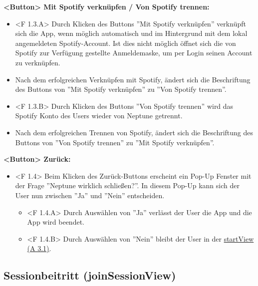 \documentclass[oneside, ngerman]{sdqtechreport}
\begin{document}
\textbf{<Button> Mit Spotify verknüpfen / Von Spotify trennen:}
\begin{itemize}
    \hypertarget{<F 1.3.A>}{}
    \item <F 1.3.A> Durch Klicken des Buttons ''Mit Spotify verknüpfen'' verknüpft sich die App, wenn möglich automatisch und im Hintergrund mit dem lokal angemeldeten Spotify-Account. Ist dies nicht möglich öffnet sich die von Spotify zur Verfügung gestellte Anmeldemaske, um per Login seinen Account zu verknüpfen.
    \item Nach dem erfolgreichen Verknüpfen mit Spotify, ändert sich die Beschriftung des Buttons von ''Mit Spotify verknüpfen'' zu ''Von Spotify trennen''.
    \hypertarget{<F 1.3.B>}{}
    \item <F 1.3.B> Durch Klicken des Buttons ''Von Spotify trennen'' wird das Spotify Konto des Users wieder von Neptune getrennt.
    \item Nach dem erfolgreichen Trennen von Spotify, ändert sich die Beschriftung des Buttons von ''Von Spotify trennen'' zu ''Mit Spotify verknüpfen''.
\end{itemize}

\textbf{<Button> Zurück:}
\begin{itemize}
\hypertarget{<F 1.4>}{}
    \item <F 1.4> Beim Klicken des Zurück-Buttons erscheint ein Pop-Up Fenster mit der Frage ''Neptune wirklich schließen?''. In diesem Pop-Up kann sich der User nun zwischen ''Ja'' und ''Nein'' entscheiden.
    \begin{itemize}
        \hypertarget{<F 1.4.A>}{}
        \item <F 1.4.A> Durch Auswählen von ''Ja'' verlässt der User die App und die App wird beendet.
        \hypertarget{<F 1.4.B>}{}
        \item <F 1.4.B> Durch Auswählen von ''Nein'' bleibt der User in der \hyperlink{startView}{startView (A 3.1)}.
    \end{itemize}
\end{itemize}



\subsection{Sessionbeitritt (joinSessionView)}
\label{sec:Benutzeroberfläche:joinSessionView}
\end{document}
